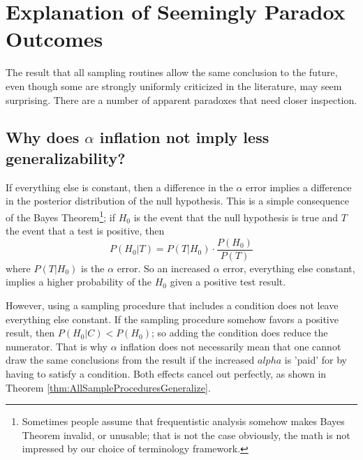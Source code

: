 \documentclass[man]{apa7}
\theoremstyle{definition}
\begin{document}

\section{Explanation of Seemingly Paradox Outcomes}
The result that all sampling routines allow the same conclusion to the future, even though some are strongly uniformly criticized in the literature, may seem surprising. There are a number of apparent paradoxes that need closer inspection.

\subsection{Why does $\alpha$ inflation not imply less generalizability?}
If everything else is constant, then a difference in the $\alpha$ error implies a difference in the posterior distribution of the null hypothesis. This is a simple consequence of the Bayes Theorem\footnote{Sometimes people assume that frequentistic analysis somehow makes Bayes Theorem invalid, or unusable; that is not the case obviously, the math is not impressed by our choice of terminology framework.}; if $H_0$ is the event that the null hypothesis is true and $T$ the event that a test is positive, then
\[ P(H_0|T) = P(T|H_0) \cdot \frac{P(H_0)}{P(T)} \]
where $P(T|H_0)$ is the $\alpha$ error. So an increased $\alpha$ error, everything else constant, implies a higher probability of the $H_0$ given a positive test result.

However, using a sampling procedure that includes a condition does not leave everything else constant. If the sampling procedure somehow favors a positive result, then $P(H_0|C) < P(H_0)$; so adding the condition does reduce the numerator. That is why $\alpha$ inflation does not necessarily mean that one cannot draw the same conclusions from the result if the increased $alpha$ is 'paid' for by having to satisfy a condition. Both effects cancel out perfectly, as shown in Theorem \ref{thm:AllSampleProceduresGeneralize}.
\end{document}
